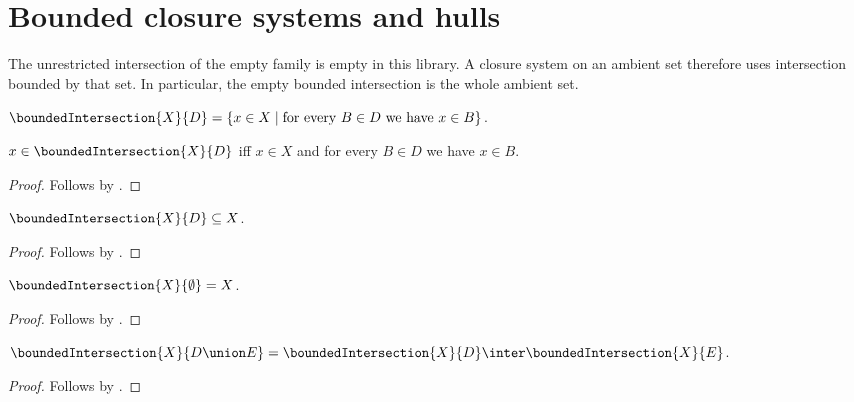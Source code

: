 


\section{Bounded closure systems and hulls}

The unrestricted intersection of the empty family is empty in this library.
A closure system on an ambient set therefore uses intersection bounded by that
set.  In particular, the empty bounded intersection is the whole ambient set.

\begin{definition}\label{bounded_intersection}
    $\boundedIntersection{X}{D}
        =\{x\in X\mid
            \text{for every $B\in D$ we have $x\in B$}\}$.
\end{definition}

\begin{proposition}\label{bounded_intersection_iff}
    $x\in\boundedIntersection{X}{D}$ iff
        $x\in X$ and for every $B\in D$ we have $x\in B$.
\end{proposition}
\begin{proof}
    Follows by .
\end{proof}

\begin{proposition}\label{bounded_intersection_subseteq}
    $\boundedIntersection{X}{D}\subseteq X$.
\end{proposition}
\begin{proof}
    Follows by .
\end{proof}

\begin{proposition}\label{bounded_intersection_empty}
    $\boundedIntersection{X}{\emptyset}=X$.
\end{proposition}
\begin{proof}
    Follows by
        .
\end{proof}

\begin{proposition}\label{bounded_intersection_union}
    $\boundedIntersection{X}{D\union E}
        =\boundedIntersection{X}{D}\inter\boundedIntersection{X}{E}$.
\end{proposition}
\begin{proof}
    Follows by
        .
\end{proof}

